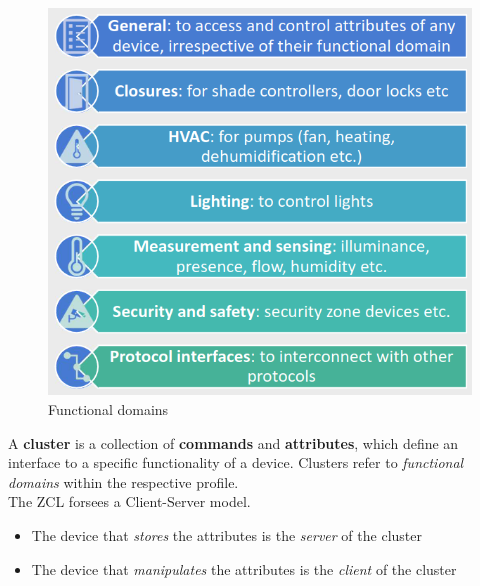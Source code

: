 \begin{paracol}{2}
   \begin{figure}[htbp]
      \centering
      \includegraphics{images/zigbee_functionaldomains.png}
      \caption{Functional domains}
      \label{fig:zigbee_functionaldomains}
   \end{figure}
   \switchcolumn
   A \textbf{cluster} is a collection of \textbf{commands} and \textbf{attributes}, which define an
   interface to a specific functionality of a device.
   Clusters refer to \textit{functional domains} within the respective profile.\\
   The ZCL forsees a Client-Server model.
   \begin{itemize}
      \item The device that \textit{stores} the attributes is the \textit{server} of the cluster
      \item The device that \textit{manipulates} the attributes is the \textit{client} of the cluster
   \end{itemize}
\end{paracol}


